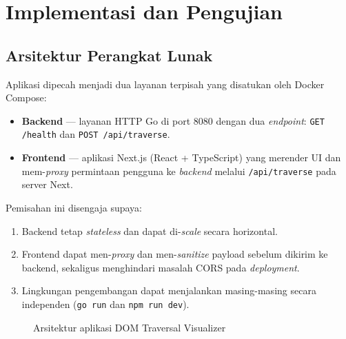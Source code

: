 \chapter{Implementasi dan Pengujian}

\section{Arsitektur Perangkat Lunak}

Aplikasi dipecah menjadi dua layanan terpisah yang disatukan oleh Docker Compose:
\begin{itemize}
    \item \textbf{Backend} --- layanan HTTP Go di port 8080 dengan dua \textit{endpoint}: \texttt{GET /health} dan \texttt{POST /api/traverse}.
    \item \textbf{Frontend} --- aplikasi Next.js (React + TypeScript) yang merender UI dan mem-\textit{proxy} permintaan pengguna ke \textit{backend} melalui \texttt{/api/traverse} pada server Next.
\end{itemize}

Pemisahan ini disengaja supaya:
\begin{enumerate}
    \item Backend tetap \textit{stateless} dan dapat di-\textit{scale} secara horizontal.
    \item Frontend dapat men-\textit{proxy} dan men-\textit{sanitize} payload sebelum dikirim ke backend, sekaligus menghindari masalah CORS pada \textit{deployment}.
    \item Lingkungan pengembangan dapat menjalankan masing-masing secara independen (\texttt{go run} dan \texttt{npm run dev}).
\end{enumerate}

\begin{figure}[H]
\centering
{}
\caption{Arsitektur aplikasi DOM Traversal Visualizer}
\end{figure}

